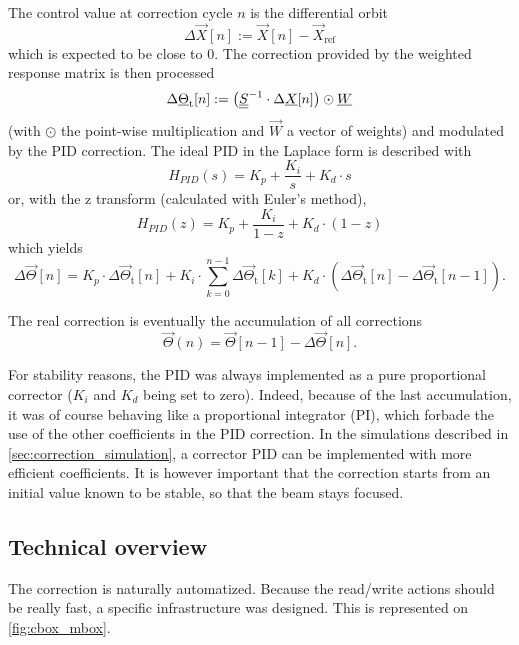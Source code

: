 The control value at correction cycle $n$ is the differential orbit
\begin{equation}
 \Delta \vec{X}[n] := \vec{X}[n]-\vec{X}_\text{ref}
\end{equation}
which is expected to be close to 0. The correction provided by the weighted response matrix is then processed
\begin{equation}
\Delta \underline{\Theta}_\text{t}[n] :=  \left(\underline{\underline{S}}^{-1} \cdot \Delta \underline{X}[n] \right) \odot \underline{W}
\end{equation}
(with $\odot$ the point-wise multiplication and $\vec{W}$ a vector of weights) and modulated by the PID correction. The ideal PID in the Laplace form is described with
\begin{equation}
H_{PID}(s) = K_p + \frac{K_i}{s} + K_d \cdot s
\end{equation}
or, with the z transform (calculated with Euler's method),
\begin{equation}
H_{PID}(z) = K_p + \frac{K_i}{1-z} + K_d \cdot (1-z)
\end{equation}
which yields
\begin{equation}
\Delta \vec{\Theta}[n] =  K_p \cdot \Delta \vec{\Theta}_\text{t}[n] + K_i \cdot \sum\limits_{k=0}^{n-1}\Delta \vec{\Theta}_\text{t}[k] + K_d \cdot \left(\Delta \vec{\Theta}_\text{t}[n] - \Delta \vec{\Theta}_\text{t}[n-1]\right).
\end{equation}

The real correction is eventually the accumulation of all corrections
\begin{equation}
\vec{\Theta}(n) = \vec{\Theta}[n-1] - \Delta \vec{\Theta}[n].
\end{equation}

For stability reasons, the PID was always implemented as a pure proportional corrector ($K_i$ and $K_d$ being set to zero). Indeed, because of the last accumulation, it was of course behaving like a proportional integrator (PI), which forbade the use of the other coefficients in the PID correction. In the simulations described in \cref{sec:correction_simulation}, a corrector PID can be implemented with more efficient coefficients. It is however important that the correction starts from an initial value known to be stable, so that the beam stays focused.

\subsection{Technical overview}
\label{sec:correction_sa_technical}
The correction is naturally automatized. Because the read/write actions should be really fast, a specific infrastructure was designed. This is represented on \cref{fig:cbox_mbox}.

